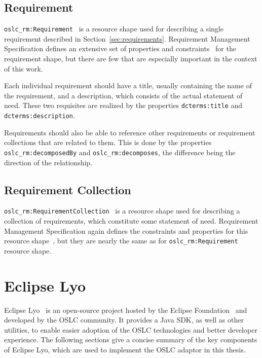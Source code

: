 \subsection*{Requirement}
\texttt{oslc\_rm:Requirement} \cite{oslc_rm_requirement} is a resource shape used for describing a single requirement described in Section \ref{sec:requirements}. Requirement Management Specification defines an extensive set of properties and constraints \cite{oslc_rm_requirement_constraints} for the requirement shape, but there are few that are especially important in the context of this work.

Each individual requirement should have a title, usually containing the name of the requirement, and a description, which consists of the actual statement of need. These two requisites are realized by the properties \texttt{dcterms:title} and \texttt{dcterms:description}.

Requirements should also be able to reference other requirements or requirement collections that are related to them. This is done by the properties \texttt{oslc\_rm:decomposedBy} and \texttt{oslc\_rm:decomposes}, the difference being the direction of the relationship.

\subsection*{Requirement Collection}
\texttt{oslc\_rm:RequirementCollection} \cite{oslc_rm_requirement_collection} is a resource shape used for describing a collection of requirements, which constitute some statement of need. Requirement Management Specification again defines the constraints and properties for this resource shape \cite{oslc_rm_requirement_collection_constraints}, but they are nearly the same as for \texttt{oslc\_rm:Requirement} resource shape.

\section{Eclipse Lyo}
Eclipse Lyo \cite{eclipse_lyo} is an open-source project hosted by the Eclipse Foundation \cite{eclipse} and developed by the OSLC community. It provides a Java SDK, as well as other utilities, to enable easier adoption of the OSLC technologies and better developer experience. The following sections give a concise summary of the key components of Eclipse Lyo, which are used to implement the OSLC adaptor in this thesis.

